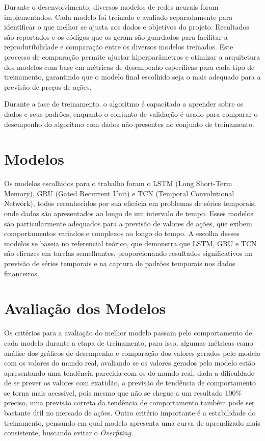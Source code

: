 Durante o desenvolvimento, diversos modelos de redes neurais foram implementados. Cada modelo foi treinado e avaliado separadamente para identificar o que melhor se ajusta aos dados e objetivos do projeto. Resultados são reportados e os códigos que os geram são guardados para facilitar a reprodutibilidade e comparação entre os diversos modelos treinados. Este processo de comparação permite ajustar hiperparâmetros e otimizar a arquitetura dos modelos com base em métricas de desempenho específicas para cada tipo de treinamento, garantindo que o modelo final escolhido seja o mais adequado para a previsão de preços de ações.

Durante a fase de treinamento, o algoritmo é capacitado a aprender sobre os dados e seus padrões, enquanto o conjunto de validação é usado para comparar o desempenho do algoritmo com dados não presentes no conjunto de treinamento.

\section{Modelos}

Os modelos escolhidos para o trabalho foram o LSTM (Long Short-Term Memory), GRU (Gated Recurrent Unit) e TCN (Temporal Convolutional Network), todos reconhecidos por sua eficácia em problemas de séries temporais, onde dados são apresentados ao longo de um intervalo de tempo. Esses modelos são particularmente adequados para a previsão de valores de ações, que exibem comportamentos variados e complexos ao longo do tempo. A escolha desses modelos se baseia no referencial teórico, que demonstra que LSTM, GRU e TCN são eficazes em tarefas semelhantes, proporcionando resultados significativos na previsão de séries temporais e na captura de padrões temporais nos dados financeiros.

\section{Avaliação dos Modelos}

Os critérios para a avaliação do melhor modelo passam pelo comportamento de cada modelo durante a etapa de treinamento, para isso, algumas métricas como análise dos gráficos de desempenho e comparação dos valores gerados pelo modelo com os valores do mundo real, avaliando se os valores gerados pelo modelo estão apresentando uma tendência parecida com os do mundo real, dada a dificuldade de se prever os valores com exatidão, a previsão de tendência de comportamento se torna mais acessível, pois mesmo que não se chegue a um resultado 100\% preciso, uma previsão correta da tendência de comportamento também pode ser bastante útil no mercado de ações. Outro critério importante é a estabilidade do treinamento, pensando em qual modelo apresenta uma curva de aprendizado mais consistente, buscando evitar o \textit{Overfiting}.

